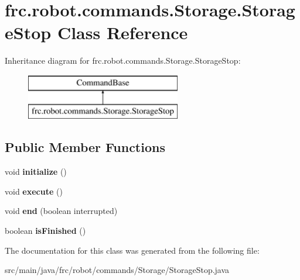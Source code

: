 \hypertarget{classfrc_1_1robot_1_1commands_1_1_storage_1_1_storage_stop}{}\section{frc.\+robot.\+commands.\+Storage.\+Storage\+Stop Class Reference}
\label{classfrc_1_1robot_1_1commands_1_1_storage_1_1_storage_stop}
Inheritance diagram for frc.\+robot.\+commands.\+Storage.\+Storage\+Stop\+:\begin{figure}[H]
\begin{center}
\leavevmode
\includegraphics[height=2.000000cm]{classfrc_1_1robot_1_1commands_1_1_storage_1_1_storage_stop}
\end{center}
\end{figure}
\subsection*{Public Member Functions}
\begin{DoxyCompactItemize}
\item 
\mbox{\label{classfrc_1_1robot_1_1commands_1_1_storage_1_1_storage_stop_aecce020621db853bd329cbede6bc2671}} 
void {\bfseries initialize} ()
\item 
\mbox{\label{classfrc_1_1robot_1_1commands_1_1_storage_1_1_storage_stop_a9e166eb923175933105953c414afdfaa}} 
void {\bfseries execute} ()
\item 
\mbox{\label{classfrc_1_1robot_1_1commands_1_1_storage_1_1_storage_stop_aafc983eb4442c101692f7999c1b4015f}} 
void {\bfseries end} (boolean interrupted)
\item 
\mbox{\label{classfrc_1_1robot_1_1commands_1_1_storage_1_1_storage_stop_a8c2dfc6de87fcc958dc57d140cd6718a}} 
boolean {\bfseries is\+Finished} ()
\end{DoxyCompactItemize}


The documentation for this class was generated from the following file\+:\begin{DoxyCompactItemize}
\item 
src/main/java/frc/robot/commands/\+Storage/Storage\+Stop.\+java\end{DoxyCompactItemize}
